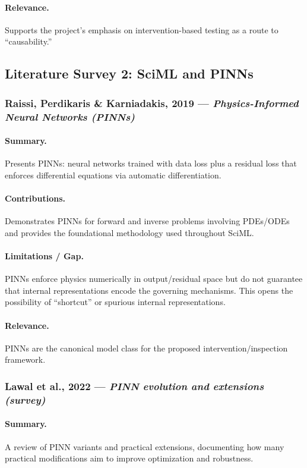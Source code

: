 \documentclass[12pt,singleside,a4paper]{article}
\begin{document}
\paragraph{Relevance.}
Supports the project’s emphasis on intervention-based testing as a route to ``causability.'' 
\subsection{Literature Survey 2: SciML and PINNs}

\subsubsection{Raissi, Perdikaris \& Karniadakis, 2019 — \textit{Physics-Informed Neural Networks (PINNs)}}
\paragraph{Summary.}
Presents PINNs: neural networks trained with data loss plus a residual loss that enforces differential equations via automatic differentiation.  
\paragraph{Contributions.}
Demonstrates PINNs for forward and inverse problems involving PDEs/ODEs and provides the foundational methodology used throughout SciML.  
\paragraph{Limitations / Gap.}
PINNs enforce physics numerically in output/residual space but do not guarantee that internal representations encode the governing mechanisms. This opens the possibility of ``shortcut'' or spurious internal representations.  
\paragraph{Relevance.}
PINNs are the canonical model class for the proposed intervention/inspection framework. 

\subsubsection{Lawal et al., 2022 — \textit{PINN evolution and extensions (survey)}}
\paragraph{Summary.}
A review of PINN variants and practical extensions, documenting how many practical modifications aim to improve optimization and robustness.  
\end{document}
